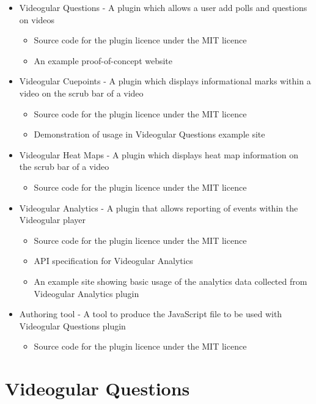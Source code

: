 \documentclass[12pt,a4paper]{article}
\begin{document}
\begin{itemize}
\item Videogular Questions - A plugin which allows a user add polls and questions on videos
	\begin{itemize}
	\item Source code for the plugin licence under the MIT licence
	\item An example proof-of-concept website
	\end{itemize}
	
\item Videogular Cuepoints - A plugin which displays informational marks within a video on the scrub bar of a video
	\begin{itemize}
	\item Source code for the plugin licence under the MIT licence
	\item Demonstration of usage in Videogular Questions example site
	\end{itemize}
	
\item Videogular Heat Maps - A plugin which displays heat map information on the scrub bar of a video
	\begin{itemize}
	\item Source code for the plugin licence under the MIT licence
	\end{itemize}
	
\item Videogular Analytics - A plugin that allows reporting of events within the Videogular player
	\begin{itemize}
	\item Source code for the plugin licence under the MIT licence
	\item API specification for Videogular Analytics
	\item An example site showing basic usage of the analytics data collected from Videogular Analytics plugin
	\end{itemize}
	
\item Authoring tool - A tool to produce the JavaScript file to be used with Videogular Questions plugin
	\begin{itemize}
	\item Source code for the plugin licence under the MIT licence
	\end{itemize}
\end{itemize}

\section*{Videogular Questions}
\end{document}
